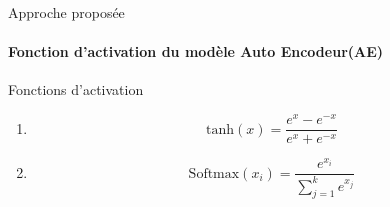 \documentclass[aspectratio=169,professionalfonts, 12pt]{beamer}
\begin{document}
\begin{frame}{Approche proposée}
	\framesubtitle{Fonction d'activation du modèle Auto Encodeur(AE)}
\begin{minipage}{0.5\textwidth}
\end{minipage}
\textbf{}
\begin{minipage}{0.4\textwidth}
	\begin{block}{Fonctions d'activation}
		\begin{enumerate}
			 \item<1> {	
	$$\text{tanh}(x)= \frac{e^{x}-e^{-x}}{e^{x}+e^{-x}}$$
					 }
			 \item<2> {
	$$\text{Softmax}(x_i) = \frac{e^{x_i}}{\sum_{j=1}^k e^{x_j}}$$
 			}
		\end{enumerate} 
	\end{block}
\end{minipage}
\end{frame}
  
\end{document}
